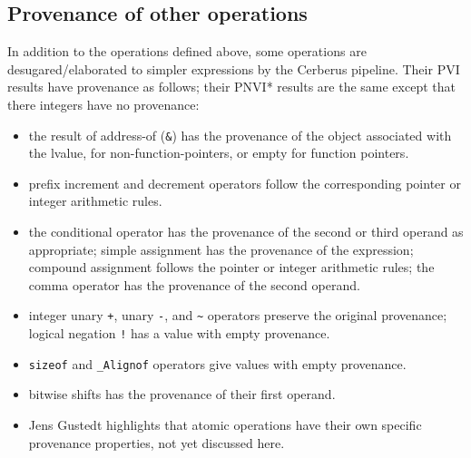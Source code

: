\documentclass[acmsmall,review,screen]{acmart}\settopmatter{printfolios=true,printccs=false,printacmref=false}
\newenvironment{tightitemize}{

 \begin{itemize}
   \setlength{\itemsep}{0pt}
   \setlength{\parskip}{0pt}
   \setlength{\leftmargin}{0pt}
   \setlength{\leftmargini}{1.5mm}
   \setlength{\leftmarginii}{3mm}
   \setlength{\leftmarginiii}{4.5mm}
   \setlength{\labelwidth}{1.5mm}
   \setlength{\itemindent}{0mm}
   \setlength{\labelsep}{1.5mm}
   \setlength{\rightmargin}{0pt}
   \setlength{\topsep}{0pt}
   \setlength{\parsep}{0pt}}{\end{itemize}
 }
\begin{document}
\subsection{Provenance of other operations}
In addition to the operations defined above, 
some operations are desugared/elaborated to simpler
expressions by the Cerberus pipeline. 
Their PVI results have
provenance  as follows; their PNVI* results are the same except that
there integers have no provenance:
\begin{tightitemize}
  \item
    the result of address-of (\lstinline{&}) has the provenance of the
    object associated with the lvalue, for non-function-pointers, or
  empty for function pointers.
  \item
    prefix increment and decrement operators follow the corresponding pointer or
    integer arithmetic rules.
  \item
    the conditional operator has the provenance of the second or third
    operand as appropriate;
    simple assignment has the provenance of
    the expression; compound assignment follows the pointer or integer
    arithmetic rules; the comma operator has the provenance of
    the second operand.
  \item
    integer unary \lstinline{+}, unary \lstinline{-}, and
    \lstinline{~} operators preserve the original
    provenance; logical negation \lstinline{!} has a value with empty provenance.
  \item
    \lstinline{sizeof} and \lstinline{_Alignof} operators give values with
    empty provenance.
  \item
    bitwise shifts has the provenance of their first operand.

\item
Jens Gustedt highlights that atomic operations have their own specific provenance
properties, not yet discussed here.

\end{tightitemize}




\end{document}
